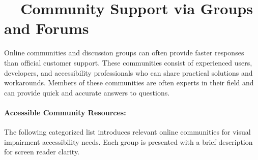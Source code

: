 \section{~~Community Support via Groups and Forums}
\label{app1:community}
Online communities and discussion groups can often provide faster responses than official customer support. These communities consist of experienced users, developers, and accessibility professionals who can share practical solutions and workarounds. Members of these communities are often experts in their field and can provide quick and accurate answers to questions.

\paragraph{Accessible Community Resources:}
The following categorized list introduces relevant online communities for visual impairment accessibility needs. Each group is presented with a brief description for screen reader clarity.


